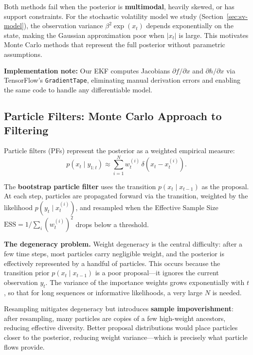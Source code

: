 \documentclass[12pt,a4paper]{article}
\theoremstyle{definition}
\theoremstyle{remark}
\begin{document}
Both methods fail when the posterior is \textbf{multimodal}, heavily skewed, or has support constraints. For the stochastic volatility model we study (Section~\ref{sec:sv-model}), the observation variance $\beta^2 \exp(x_t)$ depends exponentially on the state, making the Gaussian approximation poor when $|x_t|$ is large. This motivates Monte Carlo methods that represent the full posterior without parametric assumptions.

\textbf{Implementation note:} Our EKF computes Jacobians $\partial f / \partial x$ and $\partial h / \partial x$ via TensorFlow's \texttt{GradientTape}, eliminating manual derivation errors and enabling the same code to handle any differentiable model.

\subsection{Particle Filters: Monte Carlo Approach to Filtering}

Particle filters (PFs) \citep{gordon1993,doucet2009} represent the posterior as a weighted empirical measure:
\begin{equation}
	p(x_t \mid y_{1:t}) \approx \sum_{i=1}^{N} w_t^{(i)} \, \delta(x_t - x_t^{(i)}).
\end{equation}

The \textbf{bootstrap particle filter} uses the transition $p(x_t \mid x_{t-1})$ as the proposal. At each step, particles are propagated forward via the transition, weighted by the likelihood $p(y_t \mid x_t^{(i)})$, and resampled when the Effective Sample Size $\text{ESS} = 1 / \sum_i (w_t^{(i)})^2$ drops below a threshold.

\textbf{The degeneracy problem.} Weight degeneracy is the central difficulty: after a few time steps, most particles carry negligible weight, and the posterior is effectively represented by a handful of particles. This occurs because the transition prior $p(x_t \mid x_{t-1})$ is a poor proposal---it ignores the current observation $y_t$. The variance of the importance weights grows exponentially with $t$ \citep{doucet2009}, so that for long sequences or informative likelihoods, a very large $N$ is needed.

Resampling mitigates degeneracy but introduces \textbf{sample impoverishment}: after resampling, many particles are copies of a few high-weight ancestors, reducing effective diversity. Better proposal distributions would place particles closer to the posterior, reducing weight variance---which is precisely what particle flows provide.
\end{document}
